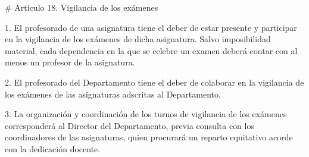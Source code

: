 \documentclass{article}
\begin{document}
\begin{itemize}
\begin{itemize}
\begin{scriptsize}
                  \# Artículo 18. Vigilancia de los exámenes

                  1. El profesorado de una asignatura tiene el deber de estar presente y participar en la vigilancia de los exámenes de dicha asignatura. Salvo imposibilidad material, cada dependencia en la que se celebre un examen deberá contar con al menos un profesor de la asignatura.

                  2. El profesorado del Departamento tiene el deber de colaborar en la vigilancia de los exámenes de las asignaturas adscritas al Departamento.

                  3. La organización y coordinación de los turnos de vigilancia de los exámenes corresponderá al Director del Departamento, previa consulta con los coordinadores de las asignaturas, quien procurará un reparto equitativo acorde con la dedicación docente.
                \end{scriptsize}
        \end{itemize}


\end{itemize}
\end{document}

